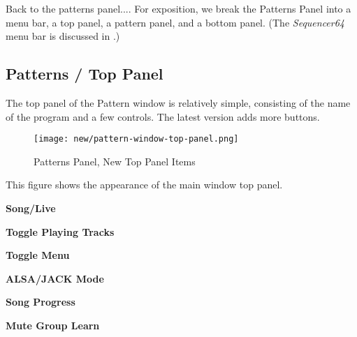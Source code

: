    Back to the patterns panel....  For exposition, we break the Patterns Panel
   into a menu bar, a top panel, a pattern panel, and a bottom panel.
   (The \textsl{Sequencer64} menu bar is discussed in
   .)

\subsection{Patterns / Top Panel}
\label{subsec:seq64_patterns_panel_top}

   The top panel of the Pattern window is relatively simple, consisting of the
   name of the program and a few controls.  The latest version adds more
   buttons.
   



\begin{figure}[H]
   \centering 
   \texttt{[image: new/pattern-window-top-panel.png]}
   \caption{Patterns Panel, New Top Panel Items}
   \label{fig:pattern_window_new_top_panel_items}
\end{figure}

   This figure shows the appearance of the main window top panel.
 
   \begin{enumber}
      \item \textbf{Song/Live}
      \item \textbf{Toggle Playing Tracks}
      \item \textbf{Toggle Menu}
      \item \textbf{ALSA/JACK Mode}
      \item \textbf{Song Progress}
      \item \textbf{Mute Group Learn}
   \end{enumber}

